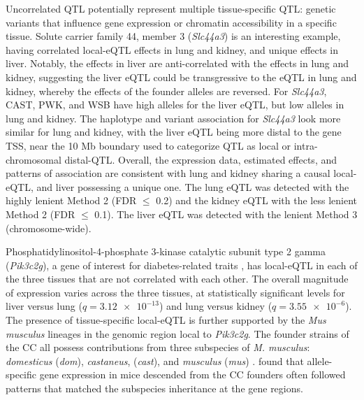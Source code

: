 Uncorrelated QTL potentially represent multiple tissue-specific QTL: genetic variants that influence gene expression or chromatin accessibility in a specific tissue. Solute carrier family 44, member 3 (\textit{Slc44a3}) is an interesting example, having correlated local-eQTL effects in lung and kidney, and unique effects in liver. Notably, the effects in liver are anti-correlated with the effects in lung and kidney, suggesting the liver eQTL could be transgressive \citep{Rieseberg1999} to the eQTL in lung and kidney, whereby the effects of the founder alleles are reversed. For \textit{Slc44a3}, CAST, PWK, and WSB have high alleles for the liver eQTL, but low alleles in lung and kidney. The haplotype and variant association for \textit{Slc44a3} look more similar for lung and kidney, with the liver eQTL being more distal to the gene TSS, near the 10 Mb boundary used to categorize QTL as local or intra-chromosomal distal-QTL. Overall, the expression data, estimated effects, and patterns of association are consistent with lung and kidney sharing a causal local-eQTL, and liver possessing a unique one. The lung eQTL was detected with the highly lenient Method 2 (FDR $\leq$ 0.2) and the kidney eQTL with the less lenient Method 2 (FDR $\leq$ 0.1). The liver eQTL was detected with the lenient Method 3 (chromosome-wide). 

Phosphatidylinositol-4-phosphate 3-kinase catalytic subunit type 2 gamma (\textit{Pik3c2g}), a gene of interest for diabetes-related traits \citep{Braccini2015}, has local-eQTL in each of the three tissues that are not correlated with each other. The overall magnitude of expression varies across the three tissues, at statistically significant levels for liver versus lung ($q = \num{3.12e-13}$) and lung versus kidney ($q = \num{3.55e-6}$). The presence of tissue-specific local-eQTL is further supported by the \textit{Mus musculus} lineages in the genomic region local to \textit{Pik3c2g}. The founder strains of the CC all possess contributions from three subspecies of \textit{M. musculus}: \textit{domesticus} (\textit{dom}), \textit{castaneus}, (\textit{cast}), and \textit{musculus} (\textit{mus}) \citep{Yang2011}. \cite{Crowley2015} found that allele-specific gene expression in mice descended from the CC founders often followed patterns that matched the subspecies inheritance at the gene regions.

